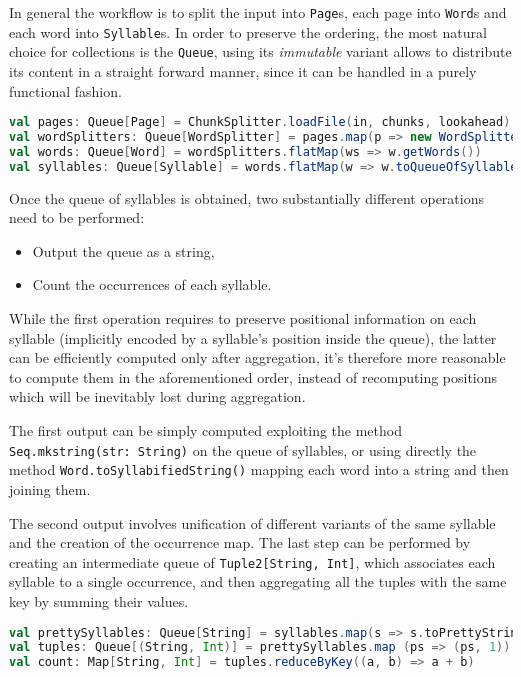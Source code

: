 In general the workflow is to split the input into \texttt{Page}s, each page into \texttt{Word}s and each word into \texttt{Syllable}s. In order to preserve the ordering, the most natural choice for collections is the \texttt{Queue}, using its \emph{immutable} variant allows to distribute its content in a straight forward manner, since it can be handled in a purely functional fashion.

\begin{lstlisting}[mathescape=true,language=scala, caption={Syllable extraction pseudocode}]
val pages: Queue[Page] = ChunkSplitter.loadFile(in, chunks, lookahead)
val wordSplitters: Queue[WordSplitter] = pages.map(p => new WordSplitter(p))
val words: Queue[Word] = wordSplitters.flatMap(ws => w.getWords())
val syllables: Queue[Syllable] = words.flatMap(w => w.toQueueOfSyllables())
\end{lstlisting}

Once the queue of syllables is obtained, two substantially different operations need to be performed:
\begin{itemize}
	\item Output the queue as a string,
	\item Count the occurrences of each syllable.
\end{itemize}

While the first operation requires to preserve positional information on each syllable (implicitly encoded by a syllable's position inside the queue), the latter can be efficiently computed only after aggregation, it's therefore more reasonable to compute them in the aforementioned order, instead of recomputing positions which will be inevitably lost during aggregation.

The first output can be simply computed exploiting the method\\ \texttt{Seq.mkstring(str: String)} on the queue of syllables, or using directly the method \texttt{Word.toSyllabifiedString()} mapping each word into a string and then joining them.

The second output involves unification of different variants of the same syllable and the creation of the occurrence map.
The last step can be performed by creating an intermediate queue of \texttt{Tuple2[String, Int]}, which associates each syllable to a single occurrence, and then aggregating all the tuples with the same key by summing their values.

\begin{lstlisting}[mathescape=true,language=scala, caption={Syllable counting pseudocode}]
val prettySyllables: Queue[String] = syllables.map(s => s.toPrettyString)
val tuples: Queue[(String, Int)] = prettySyllables.map (ps => (ps, 1))
val count: Map[String, Int] = tuples.reduceByKey((a, b) => a + b)
\end{lstlisting}

